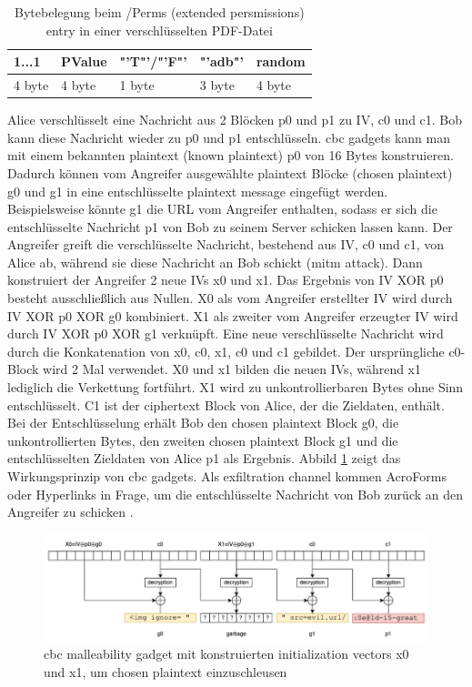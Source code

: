 \begin{table}[!htbp]
	\centering
	\begin{tabular}{|p{2cm}|p{2cm}|p{2cm}|p{2cm}|p{2cm}|}
	\hline
	\textbf{1...1}	& \textbf{PValue} 	& \textbf{"'T"'/"'F"'} 	& \textbf{"'adb"'} 	& \textbf{random} 	\\ 
	\hline
	4 byte 			& 4 byte 			& 1 byte  				& 3 byte 			& 4 byte 			\\ 
	\hline
	\end{tabular}
	\caption{Bytebelegung beim /Perms (extended persmissions) entry in einer verschlüsselten PDF-Datei \cite{ccc-break-pdf}}
	\label{table:perms}
\end{table}

Alice verschlüsselt eine Nachricht aus 2 Blöcken p0 und p1 zu IV, c0 und c1. Bob kann diese Nachricht wieder zu p0 und p1 entschlüsseln. \gls{cbc} gadgets kann man mit einem bekannten plaintext (known plaintext) p0 von 16 Bytes konstruieren. Dadurch können vom Angreifer ausgewählte plaintext Blöcke (chosen plaintext) g0 und g1 in eine entschlüsselte plaintext message eingefügt werden. Beispielsweise könnte g1 die URL vom Angreifer enthalten, sodass er sich die entschlüsselte Nachricht p1 von Bob zu seinem Server schicken lassen kann. Der Angreifer greift die verschlüsselte Nachricht, bestehend aus IV, c0 und c1, von Alice ab, während sie diese Nachricht an Bob schickt (\gls{mitm} attack). Dann konstruiert der Angreifer 2 neue IVs x0 und x1. Das Ergebnis von IV XOR p0 besteht ausschließlich aus Nullen. X0 als vom Angreifer erstellter IV wird durch IV XOR p0 XOR g0 kombiniert. X1 als zweiter vom Angreifer erzeugter IV wird durch IV XOR p0 XOR g1 verknüpft. Eine neue verschlüsselte Nachricht wird durch die Konkatenation von x0, c0, x1, c0 und c1 gebildet. Der ursprüngliche c0-Block wird 2 Mal verwendet. X0 und x1 bilden die neuen IVs, während x1 lediglich die Verkettung fortführt. X1 wird zu unkontrollierbaren Bytes ohne Sinn entschlüsselt. C1 ist der ciphertext Block von Alice, der die Zieldaten, enthält. Bei der Entschlüsselung erhält Bob den chosen plaintext Block g0, die unkontrollierten Bytes, den zweiten chosen plaintext Block g1 und die entschlüsselten Zieldaten von Alice p1 als Ergebnis. Abbild \ref{fig:gadget} zeigt das Wirkungsprinzip von \gls{cbc} gadgets. Als exfiltration channel kommen AcroForms oder Hyperlinks in Frage, um die entschlüsselte Nachricht von Bob zurück an den Angreifer zu schicken \cite{gadget, ccc-break-pdf, crypto-web}.

\begin{figure}[!htbp]
	\centering
	\includegraphics[width=1\textwidth]{"images/gadget2-gadget.png"}
	\caption{\gls{cbc} malleability gadget mit konstruierten initialization vectors x0 und x1, um chosen plaintext einzuschleusen \cite{gadget}}
	\label{fig:gadget}
\end{figure}

